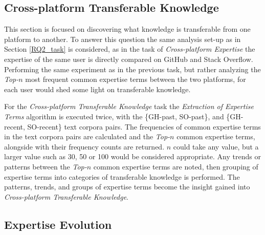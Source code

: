     \subsection{Cross-platform Transferable Knowledge\label{RQ3_task}}
        
        This section is focused on discovering what knowledge is transferable from one platform to another. To answer this question the same analysis set-up as in Section \ref{RQ2_task} is considered, as in the task of \emph{Cross-platform Expertise} the expertise of the same user is directly compared on GitHub and Stack Overflow. Performing the same experiment as in the previous task, but rather analyzing the \emph{Top-$n$} most frequent common expertise terms between the two platforms, for each user would shed some light on transferable knowledge.
        
        For the \emph{Cross-platform Transferable Knowledge} task the \emph{Extraction of Expertise Terms} algorithm is executed twice, with the \{GH-past, SO-past\}, and \{GH-recent, SO-recent\} text corpora pairs. The frequencies of common expertise terms in the text corpora pairs are calculated and the \emph{Top-$n$} common expertise terms, alongside with their frequency counts are returned. $n$ could take any value, but a larger value such as 30, 50 or 100 would be considered appropriate. Any trends or patterns between the \emph{Top-$n$} common expertise terms are noted, then grouping of expertise terms into categories of transferable knowledge is performed. The patterns, trends, and groups of expertise terms become the insight gained into \emph{Cross-platform Transferable Knowledge}.
        
    \subsection{Expertise Evolution\label{RQ4_task}}
        
